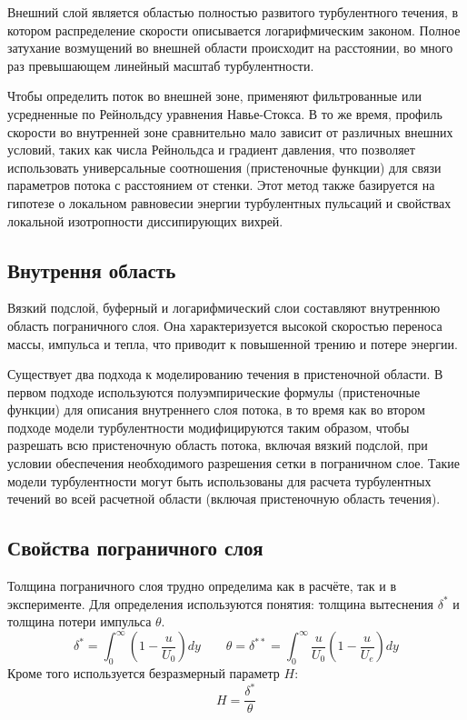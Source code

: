 	Внешний слой является областью полностью развитого турбулентного течения, в котором распределение скорости описывается логарифмическим законом. Полное затухание возмущений во внешней области происходит на расстоянии, во много раз превышающем линейный масштаб турбулентности.
	
	Чтобы определить поток во внешней зоне, применяют фильтрованные или усредненные по Рейнольдсу уравнения Навье-Стокса. В то же время, профиль скорости во внутренней зоне сравнительно мало зависит от различных внешних условий, таких как числа Рейнольдса и градиент давления, что позволяет использовать универсальные соотношения (пристеночные функции) для связи параметров потока с расстоянием от стенки. Этот метод также базируется на гипотезе о локальном равновесии энергии турбулентных пульсаций и свойствах локальной изотропности диссипирующих вихрей.

\subsection{Внутрення область}

	Вязкий подслой, буферный и логарифмический слои составляют внутреннюю область пограничного слоя. Она характеризуется высокой скоростью переноса массы, импульса и тепла, что приводит к повышенной трению и потере энергии.
	
	Существует два подхода к моделированию течения в пристеночной области. В первом подходе используются полуэмпирические формулы (пристеночные функции) для описания внутреннего слоя потока, в то время как во втором подходе модели турбулентности модифицируются таким образом, чтобы разрешать всю пристеночную область потока, включая вязкий подслой, при условии обеспечения необходимого разрешения сетки в пограничном слое. Такие модели турбулентности могут быть использованы для расчета турбулентных течений во всей расчетной области (включая пристеночную область течения).

\subsection{Свойства пограничного слоя}
	
	Толщина пограничного слоя трудно определима как в расчёте, так и в эксперименте. Для определения используются понятия: толщина вытеснения $\delta^*$ и толщина потери импульса $\theta$.
	\begin{equation}
		\delta^* = \int_{0}^{\infty}(1 - \frac{u}{U_0})dy \qquad \theta = \delta^{**} = \int_{0}^{\infty} \frac{u}{U_0}(1 - \frac{u}{U_e})dy
	\end{equation}
	Кроме того используется безразмерный параметр $H$:
	\begin{equation}
		H = \frac{\delta^*}{\theta}
	\end{equation}
	
